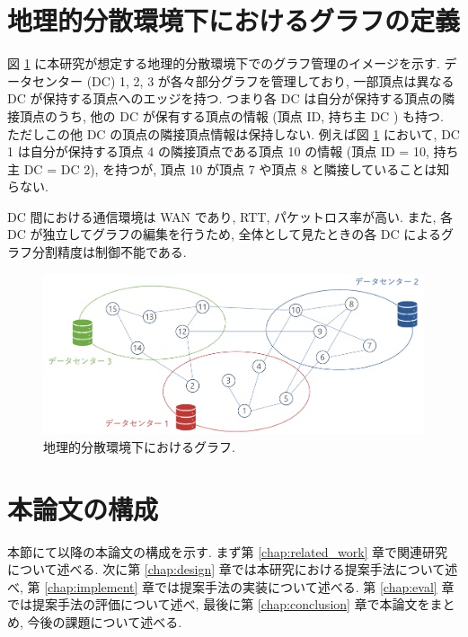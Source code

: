 \section{地理的分散環境下におけるグラフの定義}

図 \ref{地理的分散環境下におけるグラフ} に本研究が想定する地理的分散環境下でのグラフ管理のイメージを示す. データセンター (DC) 1, 2, 3 が各々部分グラフを管理しており, 一部頂点は異なる DC が保持する頂点へのエッジを持つ. つまり各 DC は自分が保持する頂点の隣接頂点のうち, 他の DC が保有する頂点の情報 (頂点 ID, 持ち主 DC ) も持つ. ただしこの他 DC の頂点の隣接頂点情報は保持しない. 例えば図 \ref{地理的分散環境下におけるグラフ} において,  DC  1 は自分が保持する頂点 4 の隣接頂点である頂点 10 の情報 (頂点 ID = 10, 持ち主 DC  =  DC  2), を持つが, 頂点 10 が頂点 7 や頂点 8 と隣接していることは知らない. 

DC 間における通信環境は WAN であり, RTT, パケットロス率が高い. また, 各 DC が独立してグラフの編集を行うため, 全体として見たときの各 DC によるグラフ分割精度は制御不能である.  

\begin{figure}[t]
    \centering
    \includegraphics[scale=0.5]{figure/dcgraph.pdf}
    \caption{地理的分散環境下におけるグラフ.}
    \label{地理的分散環境下におけるグラフ}
\end{figure}

\section{本論文の構成}

本節にて以降の本論文の構成を示す. まず第 \ref{chap:related_work} 章で関連研究について述べる. 次に第 \ref{chap:design} 章では本研究における提案手法について述べ, 第 \ref{chap:implement} 章では提案手法の実装について述べる. 第 \ref{chap:eval} 章では提案手法の評価について述べ, 最後に第 \ref{chap:conclusion} 章で本論文をまとめ, 今後の課題について述べる. 